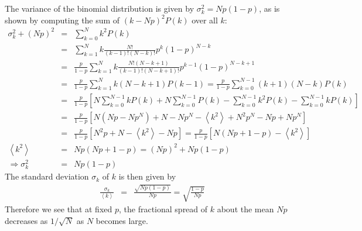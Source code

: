 \documentclass{revtex4}
\begin{document}
The variance of the binomial distribution is given by $\sigma_k^2 =
Np(1-p)$, as is shown by computing the sum of $(k-Np)^2 P(k)$ over all $k$:
\begin{eqnarray}
  \sigma_k^2 + (Np)^2 &=& \sum_{k=0}^N k^2 P(k) \nonumber \\
  &=& \sum_{k=1}^N k \frac{N!}{(k-1)! (N-k)!} p^k(1-p)^{N-k} \nonumber
  \\
  &=& \frac{p}{1-p}\sum_{k=1}^N k\frac{N! (N-k+1)}{(k-1)!(N-k+1)!}
  p^{k-1}(1-p)^{N-k+1} \nonumber \\
  &=& \frac{p}{1-p} \sum_{k=1}^N k (N-k+1) P(k-1) =
  \frac{p}{1-p}\sum_{k=0}^{N-1} (k+1)(N-k) P(k) \nonumber \\
  &=& \frac{p}{1-p} \left[N \sum_{k=0}^{N-1} kP(k) + N
    \sum_{k=0}^{N-1} P(k) - \sum_{k=0}^{N-1} k^2 P(k) -
    \sum_{k=0}^{N-1} k P(k) \right] \nonumber \\
  &=& \frac{p}{1-p} \left[N( Np - Np^N) + N - Np^N - \left<k^2\right>
    + N^2 p^N - Np + Np^N \right] \nonumber \\
  &=& \frac{p}{1-p}\left[N^2 p  + N - \left<k^2\right> - Np  \right] =
  \frac{p}{1-p}\left[N(Np + 1 - p) - \left<k^2\right> \right]
  \nonumber \\
  \left<k^2\right> &=& Np(Np + 1 - p) = (Np)^2 + Np(1-p) \nonumber \\
  \Rightarrow \sigma_k^2 &=& Np(1-p)
\end{eqnarray}
The standard deviation $\sigma_k$ of $k$ is then given by 
\begin{eqnarray}
  \frac{\sigma_k}{\left<k\right>} &=& \frac{\sqrt{Np(1-p)}}{Np} = \sqrt{\frac{1-p}{Np}}
\end{eqnarray} 
Therefore we see that at fixed $p$, the fractional spread of $k$ about
the mean $Np$ decreases as $1/\sqrt{N}$ as $N$ becomes large.
\end{document}
